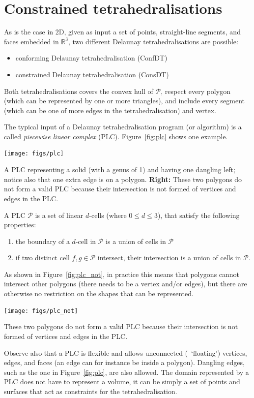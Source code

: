 %
\section[Adding constraints]{Constrained tetrahedralisations}%
\label{sec:cdt}


As is the case in 2D, given as input a set of points, straight-line segments, and faces embedded in $\mathbb{R}^3$, two different Delaunay tetrahedralisations are possible:
\begin{itemize}
  \item conforming Delaunay tetrahedralisation (ConfDT)
  \item constrained Delaunay tetrahedralisation (ConsDT)
\end{itemize}
Both tetrahedralisations covers the convex hull of $\mathcal{P}$, respect every polygon (which can be represented by one or more triangles), and include every segment (which can be one of more edges in the tetrahedralisation) and vertex.

%

The typical input of a Delaunay tetrahedralisation program (or algorithm) is a called \emph{piecewise linear complex} (PLC).
Figure~\ref{fig:plc} shows one example.
\begin{marginfigure}
  \centering
  \texttt{[image: figs/plc]}
  \caption[A PLC representing a solid]{A PLC representing a solid (with a genus of 1) and having one dangling left; notice also that one extra edge is on a polygon. \textbf{Right:} These two polygons do not form a valid PLC because their intersection is not formed of vertices and edges in the PLC.}%
\label{fig:plc}
\end{marginfigure}
A PLC $\mathcal{P}$ is a set of linear $d$-cells (where $0 \leq d \leq 3$), that satisfy the following properties:
\begin{enumerate}
  \item the boundary of a $d$-cell in $\mathcal{P}$ is a union of cells in $\mathcal{P}$
  \item if two distinct cell $f, g \in \mathcal{P}$ intersect, their intersection is a union of cells in $\mathcal{P}$.
\end{enumerate}

As shown in Figure~\ref{fig:plc_not}, in practice this means that polygons cannot intersect other polygons (there needs to be a vertex and/or edges), but there are otherwise no restriction on the shapes that can be represented.
\begin{marginfigure}
  \centering
  \texttt{[image: figs/plc\_not]}
  \caption[Two polygons that do not form a valid PLC]{These two polygons do not form a valid PLC because their intersection is not formed of vertices and edges in the PLC.}%
\label{fig:plc_not}
\end{marginfigure}
Observe also that a PLC is flexible and allows unconnected (\ie\ `floating') vertices, edges, and faces (an edge can for instance be inside a polygon).
Dangling edges, such as the one in Figure~\ref{fig:plc}, are also allowed.
The domain represented by a PLC does not have to represent a volume, it can be simply a set of points and surfaces that act as constraints for the tetrahedralisation.

